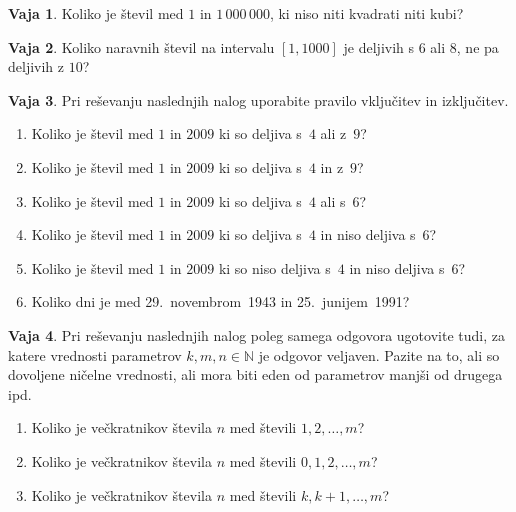 \documentclass{article}
\newcommand{\NN}{\mathbb{N}}
\theoremstyle{definition}
\newtheorem{vaja}{Vaja}
\begin{document}
\begin{vaja}
  Koliko je števil med $1$ in $1\,000\,000$, ki niso niti kvadrati niti kubi?
\end{vaja}

\begin{vaja}
  Koliko naravnih števil na intervalu $[1, 1000]$ je deljivih s $6$ ali $8$, ne pa deljivih z $10$?
\end{vaja}

\begin{vaja}
  Pri reševanju naslednjih nalog uporabite pravilo vključitev in izključitev.
  \begin{enumerate}
    \item
      Koliko je števil med $1$ in $2009$ ki so deljiva s~$4$ ali z~$9$?
    \item
      Koliko je števil med $1$ in $2009$ ki so deljiva s~$4$ in z~$9$?
    \item
      Koliko je števil med $1$ in $2009$ ki so deljiva s~$4$ ali s~$6$?
    \item
      Koliko je števil med $1$ in $2009$ ki so deljiva s~$4$ in niso deljiva s~$6$?
    \item
      Koliko je števil med $1$ in $2009$ ki so niso deljiva s~$4$ in niso deljiva s~$6$?
    \item
      Koliko dni je med 29.~novembrom~1943 in 25.~junijem~1991?
  \end{enumerate}
\end{vaja}

\begin{vaja}
  Pri reševanju naslednjih nalog poleg samega odgovora ugotovite tudi, za katere vrednosti parametrov $k, m, n \in \NN$ je odgovor veljaven. Pazite na to, ali so dovoljene ničelne vrednosti, ali mora biti eden od parametrov manjši od drugega ipd.
  \begin{enumerate}
    \item
      Koliko je večkratnikov števila $n$ med števili $1, 2, \ldots, m$?
    \item
      Koliko je večkratnikov števila $n$ med števili $0, 1, 2, \ldots, m$?
    \item
      Koliko je večkratnikov števila $n$ med števili $k, k+1, \ldots, m$?
  \end{enumerate}
\end{vaja}
\end{document}
